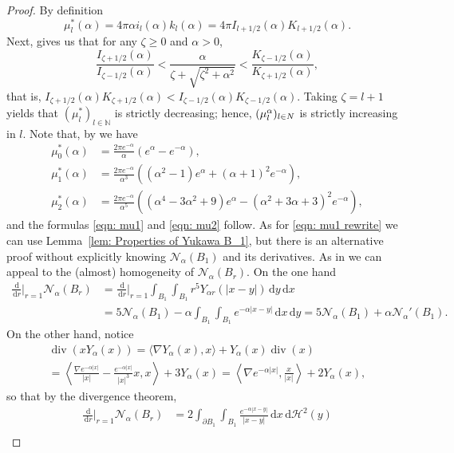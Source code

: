 \documentclass[a4paper,11pt,reqno]{amsart}
\numberwithin{equation}{section}
\theoremstyle{remark}
\theoremstyle{definition}
\renewcommand{\div}{\operatorname{div}}
\newcommand{\N}{\mathbb N}
\newcommand{\dd}{\,\mathrm{d}}
\newcommand{\nl}{\mathcal{N}_{\alpha}}
\renewcommand{\geq}{\geqslant}
\begin{document}
\begin{proof} By definition
	\[
		\mu_l^*(\alpha)=4\pi\alpha i_l(\alpha)k_l(\alpha) = 4\pi I_{l+1/2}(\alpha)K_{l+1/2}(\alpha).
	\]
Next, \cite[Theorem 1]{Segura} gives us that for any $\zeta\geq 0$ and $\alpha>0$,
	\[
		\frac{I_{\zeta+1/2}(\alpha)}{I_{\zeta-1/2}(\alpha)} < \frac{\alpha}{\zeta+\sqrt{\zeta^2+\alpha^2}} < \frac{K_{\zeta-1/2}(\alpha)}{K_{\zeta+1/2}(\alpha)},
	\]
that is, $I_{\zeta+1/2}(\alpha)K_{\zeta+1/2}(\alpha)<I_{\zeta-1/2}(\alpha)K_{\zeta-1/2}(\alpha)$. Taking $\zeta=l+1$ yields that $(\mu_l^*)_{l\in\N}$ is strictly decreasing; hence, $(\mu_l^{\alpha})_{l\in\\N}$ is strictly increasing in $l$. Note that, by \cite[Eq. (14.196)]{Arfken} we have 
	\begin{align*}
		\mu_0^*(\alpha)&=\frac{2\pi e^{-\alpha}}{\alpha}\left(e^{\alpha}-e^{-\alpha}\right),\\
		\mu_1^*(\alpha)&=\frac{2\pi e^{-\alpha}}{\alpha^3}\left((\alpha^2-1)e^{\alpha}+(\alpha+1)^2e^{-\alpha}\right),\\
		\mu_2^*(\alpha)&=\frac{2\pi e^{-\alpha}}{\alpha^5}\left((\alpha^4-3\alpha^2+9)e^{\alpha}-(\alpha^2+3\alpha+3)^2 e^{-\alpha}\right),
	\end{align*}
and the formulas \eqref{eqn: mu1} and \eqref{eqn: mu2} follow. As for \eqref{eqn: mu1 rewrite} we can use Lemma~\ref{lem: Properties of Yukawa B_1}, but there is an alternative proof without explicitly knowing $\nl(B_1)$ and its derivatives. As in \cite[Proposition 8.4]{FFMMM} we can appeal to the (almost) homogeneity of $\nl(B_r)$. On the one hand
	\begin{align*}
		\frac{\dd}{\dd r}\bigg|_{r=1} \nl(B_r) &= \frac{\dd}{\dd r}\bigg|_{r=1} \int_{B_1}\int_{B_1} r^5Y_{\alpha r}(|x-y|) \dd y \dd x \\
&= 5\nl(B_1)-\alpha \int_{B_1}\int_{B_1} e^{-\alpha|x-y|} \dd x \dd y = 5\nl(B_1)+\alpha\nl'(B_1).
	\end{align*}
On the other hand, notice
	\begin{multline*}
		\div(xY_{\alpha}(x)) = \langle \nabla Y_{\alpha}(x), x\rangle + Y_{\alpha}(x)\div(x) \\
		= \left\langle \frac{\nabla e^{-\alpha |x|}}{|x|} - \frac{e^{-\alpha |x|}}{|x|^3}x , x\right\rangle + 3Y_{\alpha}(x) = \left\langle \nabla  e^{-\alpha |x|}, \frac{x}{|x|}\right\rangle +2 Y_{\alpha}(x),
	\end{multline*}
so that by the divergence theorem,
	\begin{align*}
		\frac{\dd}{\dd r}\bigg|_{r=1} \nl(B_r) &= 2\int_{\partial B_1}\int_{B_1} \frac{e^{-\alpha|x-y|}}{|x-y|} \dd x \dd\mathcal{H}^2(y) \\

\end{align*}
\end{proof}
\end{document}
